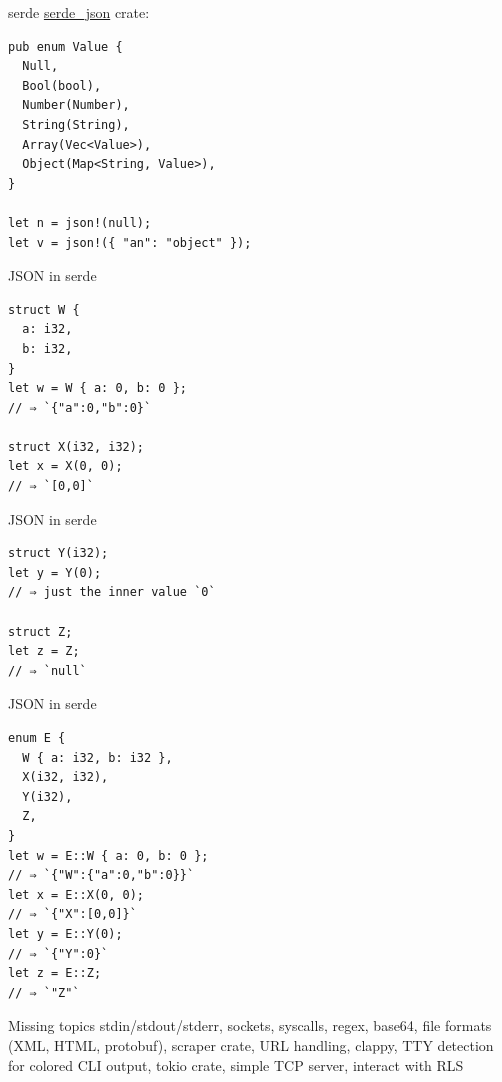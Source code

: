 \documentclass{beamer}
\begin{document}
\begin{frame}[fragile]{serde}
  \href{https://github.com/serde-rs/json}{serde\_json} crate:
  \begin{verbatim}
pub enum Value {
  Null,
  Bool(bool),
  Number(Number),
  String(String),
  Array(Vec<Value>),
  Object(Map<String, Value>),
}

let n = json!(null);
let v = json!({ "an": "object" });
  \end{verbatim}
\end{frame}


\begin{frame}[fragile]{JSON in serde}
  \begin{verbatim}
struct W {
  a: i32,
  b: i32,
}
let w = W { a: 0, b: 0 };
// ⇒ `{"a":0,"b":0}`

struct X(i32, i32);
let x = X(0, 0);
// ⇒ `[0,0]`
  \end{verbatim}
\end{frame}

\begin{frame}[fragile]{JSON in serde}
  \begin{verbatim}
struct Y(i32);
let y = Y(0);
// ⇒ just the inner value `0`

struct Z;
let z = Z;
// ⇒ `null`
  \end{verbatim}
\end{frame}

\begin{frame}[fragile]{JSON in serde}
  \begin{verbatim}
enum E {
  W { a: i32, b: i32 },
  X(i32, i32),
  Y(i32),
  Z,
}
let w = E::W { a: 0, b: 0 };
// ⇒ `{"W":{"a":0,"b":0}}`
let x = E::X(0, 0);
// ⇒ `{"X":[0,0]}`
let y = E::Y(0);
// ⇒ `{"Y":0}`
let z = E::Z;
// ⇒ `"Z"`
  \end{verbatim}
\end{frame}

\begin{frame}[fragile]{Missing topics}
  stdin/stdout/stderr, sockets, syscalls, regex, base64, file formats (XML, HTML, protobuf), scraper crate, URL handling, clappy, TTY detection for colored CLI output, tokio crate, simple TCP server, interact with RLS
\end{frame}
\end{document}
